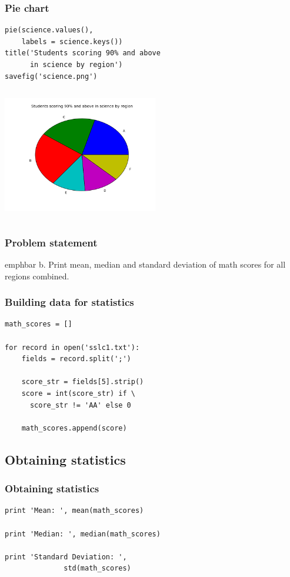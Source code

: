 \documentclass[14pt,compress]{beamer}
\newcommand{\emphbar}[1]
{\begin{beamercolorbox}[rounded=true]{emphbar} 
      {#1}
 \end{beamercolorbox}
}
\newcounter{time}
\newcommand{\inctime}[1]{\addtocounter{time}{#1}{\tiny \thetime\ m}}
\begin{document}
\begin{frame}[fragile]
  \frametitle{Pie chart}
  \small
  \begin{lstlisting}
pie(science.values(), 
    labels = science.keys())
title('Students scoring 90% and above 
      in science by region')
savefig('science.png')
  \end{lstlisting}
\begin{columns}
    \hspace*{1.1in}
\includegraphics[height=2in, interpolate=true]{data/science}
\end{columns}
  \inctime{10}
\end{frame}

\begin{frame}
  \frametitle{Problem statement}
    \emphbar{b. Print mean, median and standard deviation of math scores for all regions combined.}
\end{frame}

\begin{frame}[fragile]
  \frametitle{Building data for statistics}
  \begin{lstlisting}
math_scores = []

for record in open('sslc1.txt'):
    fields = record.split(';')

    score_str = fields[5].strip()
    score = int(score_str) if \
      score_str != 'AA' else 0

    math_scores.append(score)
  \end{lstlisting}
\end{frame}

\subsection{Obtaining statistics}
\begin{frame}[fragile]
  \frametitle{Obtaining statistics}
  \begin{lstlisting}
print 'Mean: ', mean(math_scores)

print 'Median: ', median(math_scores)

print 'Standard Deviation: ',
              std(math_scores)
  \end{lstlisting}
  \inctime{10}
\end{frame}
\end{document}
